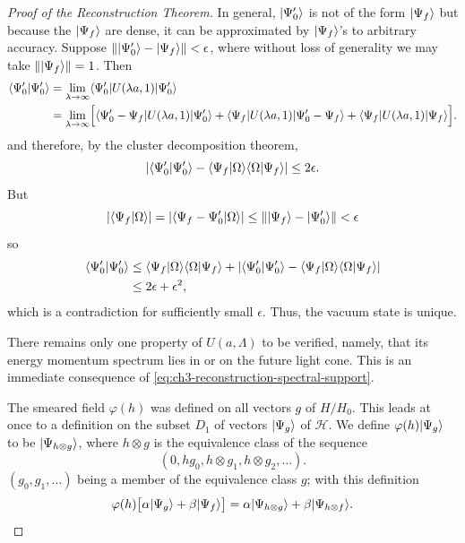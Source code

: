 \begin{proof}[Proof of the Reconstruction Theorem]
In general, \(\lvert \Psi'_0\rangle\) is not of the form \(\lvert \Psi_f\rangle\) but because
the \(\lvert \Psi_f\rangle\) are dense, it can be approximated by \(\lvert \Psi_f\rangle\)'s to
arbitrary accuracy.  Suppose
\(\lVert\lvert \Psi'_0\rangle-\lvert \Psi_f\rangle\rVert<\epsilon\), where without loss of
generality we may take \(\lVert\lvert \Psi_f\rangle\rVert=1\).  Then
\begin{equation*}
\begin{aligned}
\langle \Psi'_0\vert \Psi'_0\rangle
 &=\lim_{\lambda\to\infty}
 \langle \Psi'_0\rvert U(\lambda a,1)\lvert \Psi'_0\rangle\\
 &=\lim_{\lambda\to\infty}\Bigl[
 \langle \Psi'_0-\Psi_f\rvert U(\lambda a,1)\lvert \Psi'_0\rangle
 +\langle \Psi_f\rvert U(\lambda a,1)\lvert \Psi'_0-\Psi_f\rangle
 +\langle \Psi_f\rvert U(\lambda a,1)\lvert \Psi_f\rangle\Bigr] .
\end{aligned}
\end{equation*}
and therefore, by the cluster decomposition theorem,
\begin{equation*}
\lvert\langle \Psi'_0\vert \Psi'_0\rangle
 -\langle \Psi_f\vert \Omega\rangle\langle \Omega\vert \Psi_f\rangle\rvert
 \leq 2\epsilon .
\end{equation*}
But
\begin{equation*}
\lvert\langle \Psi_f\vert \Omega\rangle\rvert
 =\lvert\langle \Psi_f-\Psi'_0\vert \Omega\rangle\rvert
 \leq\lVert\lvert \Psi_f\rangle-\lvert \Psi'_0\rangle\rVert<\epsilon
\end{equation*}
so
\begin{equation*}
\begin{aligned}
\langle \Psi'_0\vert \Psi'_0\rangle
 &\leq \langle \Psi_f\vert \Omega\rangle\langle \Omega\vert \Psi_f\rangle
 +\lvert\langle \Psi'_0\vert \Psi'_0\rangle
 -\langle \Psi_f\vert \Omega\rangle\langle \Omega\vert \Psi_f\rangle\rvert\\
 &\leq 2\epsilon+\epsilon^2,
\end{aligned}
\end{equation*}
which is a contradiction for sufficiently small \(\epsilon\).  Thus, the
vacuum state is unique.

There remains only one property of \(U(a,\Lambda)\) to be verified, namely,
that its energy momentum spectrum lies in or on the future light cone.  This
is an immediate consequence of \eqref{eq:ch3-reconstruction-spectral-support}.

The smeared field \(\varphi(h)\) was defined on all vectors \(g\) of \(H/H_0\).
This leads at once to a definition on the subset \(D_1\) of vectors
\(\lvert \Psi_g\rangle\) of \(\mathcal H\).  We define
\(\varphi(h)\lvert \Psi_g\rangle\) to be \(\lvert \Psi_{h\otimes g}\rangle\), where
\(h\otimes g\) is the equivalence class of the sequence
\begin{equation}
(0,hg_0,h\otimes g_1,h\otimes g_2,\ldots) .
\tag{3-56}\label{eq:ch3-reconstruction-field-domain}
\end{equation}
\( (g_0,g_1,\ldots)\) being a member of the equivalence class \(g\); with
this definition
\begin{equation*}
\varphi(h)\bigl[\alpha\lvert \Psi_g\rangle+\beta\lvert \Psi_f\rangle\bigr]
 =\alpha\lvert \Psi_{h\otimes g}\rangle+\beta\lvert \Psi_{h\otimes f}\rangle .
\end{equation*}


\end{proof}
